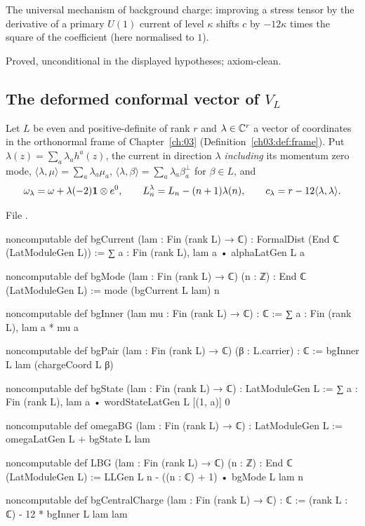 \begin{physics}
The universal mechanism of background charge: improving a stress tensor by the derivative of a primary $U(1)$
current of level $\kappa$ shifts $c$ by $-12\kappa$ times the square of the coefficient (here normalised to $1$).
\end{physics}

\begin{status}
Proved, unconditional in the displayed hypotheses; axiom-clean.
\end{status}

\subsection{The deformed conformal vector of \texorpdfstring{$V_L$}{V\_L}}

\begin{definition}\label{l05:def:latbg}
Let $L$ be even and positive-definite of rank $r$ and $\lambda\in{\mathbb{C}}^r$ a vector of coordinates in the orthonormal frame of
Chapter~\ref{ch:03} (Definition~\ref{ch03:def:frame}). Put $\lambda(z)=\sum_a\lambda_ah^a(z)$, the current in direction
$\lambda$ \emph{including} its momentum zero mode, $\langle\lambda,\mu\rangle=\sum_a\lambda_a\mu_a$,
$\langle\lambda,\beta\rangle=\sum_a\lambda_a\beta^\perp_a$ for $\beta\in L$, and
\begin{equation*}
\omega_\lambda=\omega+\lambda(-2)\mathbf{1}\otimes e^0,\qquad L^\lambda_n=L_n-(n+1)\lambda(n),\qquad
c_\lambda=r-12\langle\lambda,\lambda\rangle .
\end{equation*}
\end{definition}

\noindent File .
\begin{leancode}
noncomputable def bgCurrent (lam : Fin (rank L) → ℂ) : FormalDist (End ℂ (LatModuleGen L)) :=
  ∑ a : Fin (rank L), lam a • alphaLatGen L a

noncomputable def bgMode (lam : Fin (rank L) → ℂ) (n : ℤ) : End ℂ (LatModuleGen L) :=
  mode (bgCurrent L lam) n

noncomputable def bgInner (lam mu : Fin (rank L) → ℂ) : ℂ := ∑ a : Fin (rank L), lam a * mu a

noncomputable def bgPair (lam : Fin (rank L) → ℂ) (β : L.carrier) : ℂ :=
  bgInner L lam (chargeCoord L β)

noncomputable def bgState (lam : Fin (rank L) → ℂ) : LatModuleGen L :=
  ∑ a : Fin (rank L), lam a • wordStateLatGen L [(1, a)] 0

noncomputable def omegaBG (lam : Fin (rank L) → ℂ) : LatModuleGen L :=
  omegaLatGen L + bgState L lam

noncomputable def LBG (lam : Fin (rank L) → ℂ) (n : ℤ) : End ℂ (LatModuleGen L) :=
  LLGen L n - ((n : ℂ) + 1) • bgMode L lam n

noncomputable def bgCentralCharge (lam : Fin (rank L) → ℂ) : ℂ :=
  (rank L : ℂ) - 12 * bgInner L lam lam
\end{leancode}

